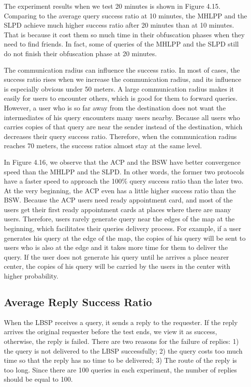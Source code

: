 The experiment results when we test 20 minutes is shown in Figure 4.15. Comparing to the average query success ratio at 10 minutes, the MHLPP and the SLPD achieve much higher success ratio after 20 minutes than at 10 minutes. That is because it cost them so much time in their obfuscation phases when they need to find friends. In fact, some of queries of the MHLPP and the SLPD still do not finish their obfuscation phase at 20 minutes.

The communication radius can influence the success ratio. In most of cases, the success ratio rises when we increase the communication radius, and its influence is especially obvious under 50 meters. A large communication radius makes it easily for users to encounter others, which is good for them to forward queries. However, a user who is so far away from the destination does not want the intermediates of his query encounters many users nearby. Because all users who carries copies of that query are near the sender instead of the destination, which decreases their query success ratio. Therefore, when the communication radius reaches 70 meters, the success ratios almost stay at the same level.

In Figure 4.16, we observe that the ACP and the BSW have better convergence speed than the MHLPP and the SLPD. In other words, the former two protocols have a faster speed to approach the 100\% query success ratio than the later two. At the very beginning, the ACP even has a little higher success ratio than the BSW. Because the ACP users need ready appointment card, and most of the users get their first ready appointment cards at places where there are many users. Therefore, users rarely generate query near the edges of the map at the beginning, which facilitates their queries delivery process. For example, if a user generates his query at the edge of the map, the copies of his query will be sent to users who is also at the edge and it takes more time for them to deliver the query. If the user does not generate his query until he arrives a place nearer center, the copies of his query will be carried by the users in the center with higher probability.


\subsection{ Average Reply Success Ratio}

\noindent When the LBSP receives a query, it sends a reply to the requester. If the reply arrives the original requester before the test ends, we view it as success, otherwise, the reply is failed. There are two reasons for the failure of replies: 1) the query is not delivered to the LBSP successfully; 2) the query costs too much time so that the reply has no time to be delivered; 3) The route of the reply is too long. Since there are 100 queries in each experiment, the number of replies should be equal to 100. 

